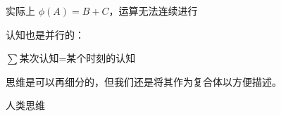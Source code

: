 \documentclass[fontset=windows, 12pt, a4paper]{article}
\begin{document}
实际上 $\phi(A)=B+C$，运算无法连续进行

认知也是并行的：\par
$\sum$某次认知=某个时刻的认知

思维是可以再细分的，但我们还是将其作为复合体以方便描述。



人类思维

% 

\end{document}
